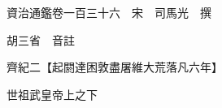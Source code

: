 










 


 
 


 

  
  
  
  
  





  
  
  
  
  
 
  

  

  
  
  



  

 
 

  
   




  

  
  


  　　資治通鑑卷一百三十六　宋　司馬光　撰

　　胡三省　音註

　　齊紀二【起閼達困敦盡屠維大荒落凡六年】

　　世祖武皇帝上之下

